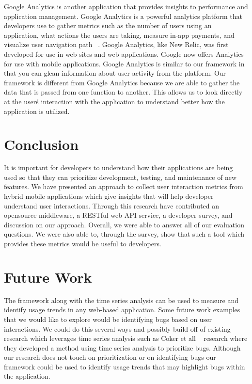 Google Analytics is another application that provides insights to performance and application management. Google Analytics is a powerful analytics platform that developers use to gather metrics such as the number of users using an application, what actions the users are taking, measure in-app payments, and visualize user navigation path ~\cite{googleAnalytics}. Google Analytics, like New Relic, was first developed for use in web sites and web applications. Google now offers Analytics for use with mobile applications. Google Analytics is similar to our framework in that you can glean information about user activity from the platform. Our framework is different from Google Analytics because we are able to gather the data that is passed from one function to another. This allows us to look directly at the user\'s interaction with the application to understand better how the application is utilized.


\section{Conclusion}
It is important for developers to understand how their applications are being used so that they can prioritize development, testing, and maintenance of new features. We have presented an approach to collect user interaction metrics from hybrid mobile applications which give insights that will help developer understand user interactions. Through this research have contributed an opensource middleware, a RESTful web API service, a developer survey, and discussion on our approach. Overall, we were able to answer all of our evaluation questions. We were also able to, through the survey, show that such a tool which provides these metrics would be useful to developers.

\section{Future Work}
The framework along with the time series analysis can be used to measure and identify usage trends in any web-based application. Some future work examples that we would like to explore would be identifying bugs based on user interactions. We could do this several ways and possibly build off of existing research which leverages time series analysis such as Coker et all ~\cite{bdbugs} research where they developed a method using time series analysis to prioritize bugs. Although our research does not touch on prioritization or on identifying bugs our framework could be used to identify usage trends that may highlight bugs within the application.

